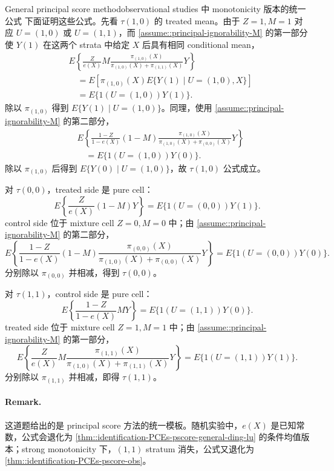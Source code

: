 \begin{exercisesolution}{General principal score method}{observational studies 中 monotonicity 版本的统一公式}
下面证明这些公式。先看 $\tau(1,0)$ 的 treated mean。由于 $Z=1,M=1$ 对应 $U=(1,0)$ 或 $U=(1,1)$，而 \cref{assume::principal-ignorability-M} 的第一部分使 $Y(1)$ 在这两个 strata 中给定 $X$ 后具有相同 conditional mean，
\begin{align*}
&E\left\{
\frac{Z}{e(X)}M
\frac{\pi_{(1,0)}(X)}{\pi_{(1,0)}(X)+\pi_{(1,1)}(X)}
Y\right\}\\
&\quad =
E\left[\pi_{(1,0)}(X)E\{Y(1)\mid U=(1,0),X\}\right]\\
&\quad =
E\{1(U=(1,0))Y(1)\}.
\end{align*}
除以 $\pi_{(1,0)}$ 得到 $E\{Y(1)\mid U=(1,0)\}$。同理，使用 \cref{assume::principal-ignorability-M} 的第二部分，
\begin{align*}
&E\left\{
\frac{1-Z}{1-e(X)}(1-M)
\frac{\pi_{(1,0)}(X)}{\pi_{(1,0)}(X)+\pi_{(0,0)}(X)}
Y\right\}\\
&\quad =
E\{1(U=(1,0))Y(0)\}.
\end{align*}
除以 $\pi_{(1,0)}$ 后得到 $E\{Y(0)\mid U=(1,0)\}$，故 $\tau(1,0)$ 公式成立。

对 $\tau(0,0)$，treated side 是 pure cell：
\[
E\left\{\frac{Z}{e(X)}(1-M)Y\right\}
=E\{1(U=(0,0))Y(1)\}.
\]
control side 位于 mixture cell $Z=0,M=0$ 中；由 \cref{assume::principal-ignorability-M} 的第二部分，
\[
E\left\{
\frac{1-Z}{1-e(X)}(1-M)
\frac{\pi_{(0,0)}(X)}{\pi_{(1,0)}(X)+\pi_{(0,0)}(X)}
Y\right\}
=E\{1(U=(0,0))Y(0)\}.
\]
分别除以 $\pi_{(0,0)}$ 并相减，得到 $\tau(0,0)$。

对 $\tau(1,1)$，control side 是 pure cell：
\[
E\left\{\frac{1-Z}{1-e(X)}MY\right\}
=E\{1(U=(1,1))Y(0)\}.
\]
treated side 位于 mixture cell $Z=1,M=1$ 中；由 \cref{assume::principal-ignorability-M} 的第一部分，
\[
E\left\{
\frac{Z}{e(X)}M
\frac{\pi_{(1,1)}(X)}{\pi_{(1,0)}(X)+\pi_{(1,1)}(X)}
Y\right\}
=E\{1(U=(1,1))Y(1)\}.
\]
分别除以 $\pi_{(1,1)}$ 并相减，即得 $\tau(1,1)$。

\paragraph{Remark.}
这道题给出的是 principal score 方法的统一模板。随机实验中，$e(X)$ 是已知常数，公式会退化为 \cref{thm::identification-PCEs-pscore-general-ding-lu} 的条件均值版本；strong monotonicity 下，$(1,1)$ stratum 消失，公式又退化为 \cref{thm::identification-PCEs-pscore-obs}。
\end{exercisesolution}
